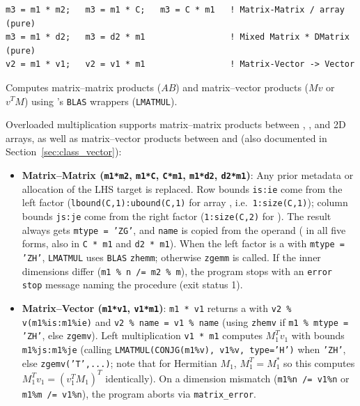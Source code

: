\lstset{language=[95]Fortran}
\begin{lstlisting}
m3 = m1 * m2;   m3 = m1 * C;   m3 = C * m1   ! Matrix-Matrix / array (pure)
m3 = m1 * d2;   m3 = d2 * m1                 ! Mixed Matrix * DMatrix (pure)
v2 = m1 * v1;   v2 = v1 * m1                 ! Matrix-Vector -> Vector
\end{lstlisting}

Computes matrix--matrix products ($A B$) and matrix--vector products ($M v$ or $v^T M$) using 's \texttt{BLAS} wrappers (\texttt{LMATMUL}).

Overloaded multiplication supports matrix--matrix products between , , and 2D  arrays, as well as matrix--vector products between  and  (also documented in Section~\ref{sec:class_vector}):
\begin{itemize}
  \item \textbf{Matrix--Matrix (\texttt{m1*m2}, \texttt{m1*C}, \texttt{C*m1}, \texttt{m1*d2}, \texttt{d2*m1})}: Any prior metadata or allocation of the LHS target is replaced. Row bounds \texttt{is:ie} come from the left factor (\texttt{lbound(C,1):ubound(C,1)} for array , i.e.\ \texttt{1:size(C,1)}); column bounds \texttt{js:je} come from the right factor (\texttt{1:size(C,2)} for ). The result always gets \texttt{mtype = 'ZG'}, and \texttt{name} is copied from the  operand ( in all five forms, also in \texttt{C * m1} and \texttt{d2 * m1}). When the left factor is a  with \texttt{mtype = 'ZH'}, \texttt{LMATMUL} uses \texttt{BLAS} \texttt{zhemm}; otherwise \texttt{zgemm} is called. If the inner dimensions differ (\texttt{m1 \% n /= m2 \% m}), the program stops with an \texttt{error stop} message naming the procedure (exit status 1).
  \item \textbf{Matrix--Vector (\texttt{m1*v1}, \texttt{v1*m1})}: \texttt{m1 * v1} returns a  with \texttt{v2 \% v(m1\%is:m1\%ie)} and \texttt{v2 \% name = v1 \% name} (using \texttt{zhemv} if \texttt{m1 \% mtype = 'ZH'}, else \texttt{zgemv}). Left multiplication \texttt{v1 * m1} computes $M_1^T v_1$ with bounds \texttt{m1\%js:m1\%je} (calling \texttt{LMATMUL(CONJG(m1\%v), v1\%v, type='H')} when \texttt{'ZH'}, else \texttt{zgemv('T',...)}; note that for Hermitian $M_1$, $M_1^T = M_1^*$ so this computes $M_1^T v_1 = (v_1^T M_1)^T$ identically). On a dimension mismatch (\texttt{m1\%n /= v1\%n} or \texttt{m1\%m /= v1\%n}), the program aborts via \texttt{matrix\_error}.
\end{itemize}

